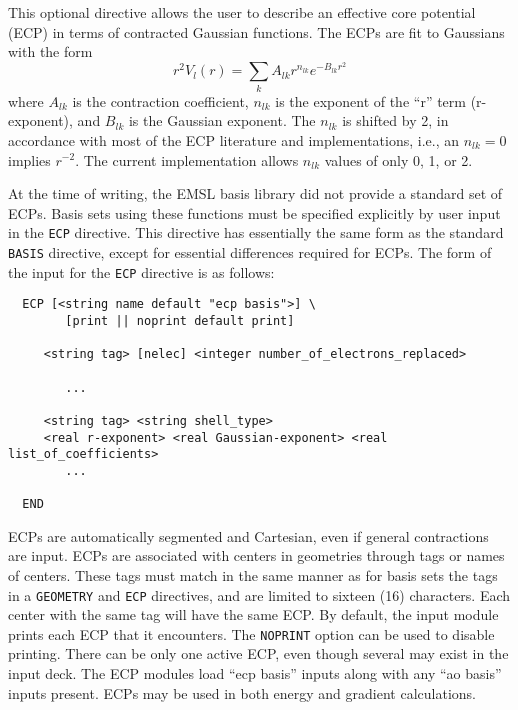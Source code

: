 \label{sec:ecp}

This optional directive allows the user to describe an effective core
potential (ECP) in terms of contracted Gaussian functions.  The ECPs
are fit to Gaussians with the form
\[
 r^2V_l(r) = \sum_{k} A_{lk} r^{n_{lk}} e^{-B_{lk}r^{2}}
\]
where $A_{lk}$ is the contraction coefficient, $n_{lk}$ is the
exponent of the ``r'' term (r-exponent), and $B_{lk}$ is the Gaussian
exponent.  The $n_{lk}$ is shifted by 2, in accordance with most of the ECP
literature and implementations, i.e., an $n_{lk} = 0$ implies
$r^{-2}$.  The current implementation allows $n_{lk}$ values
of only 0, 1, or 2. 

At the time of writing, the EMSL basis library did not provide a
standard set of ECPs.  Basis sets using these functions must be
specified explicitly by user input in the \verb+ECP+ directive.  This
directive has essentially the same form as the standard \verb+BASIS+
directive, except for essential differences required for ECPs.  The
form of the input for the \verb+ECP+ directive is as follows:


\begin{verbatim}
  ECP [<string name default "ecp basis">] \
        [print || noprint default print]

     <string tag> [nelec] <integer number_of_electrons_replaced>
 
        ...

     <string tag> <string shell_type>
     <real r-exponent> <real Gaussian-exponent> <real list_of_coefficients>
        ...
     
  END
\end{verbatim}    

ECPs are automatically segmented and Cartesian, even if general
contractions are input.  ECPs are associated with centers in
geometries through tags or names of centers.  These tags must match in
the same manner as for basis sets the tags in a \verb+GEOMETRY+ and
\verb+ECP+ directives, and are limited to sixteen (16) characters.
Each center with the same tag will have the same ECP.  By default, the
input module prints each ECP that it encounters.  The \verb+NOPRINT+
option can be used to disable printing.  There can be only one active
ECP, even though several may exist in the input deck.  The ECP modules
load ``ecp basis'' inputs along with any ``ao basis'' inputs present.
ECPs may be used in both energy and gradient calculations.

